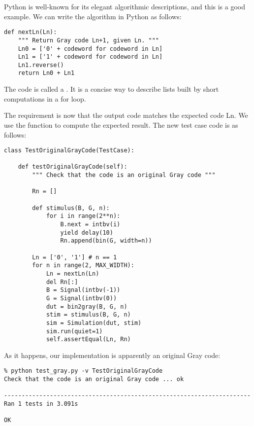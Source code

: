 Python is well-known  for its elegant algorithmic
descriptions, and this is a good example. We can write the algorithm
in Python as follows:

\begin{verbatim}
def nextLn(Ln):
    """ Return Gray code Ln+1, given Ln. """
    Ln0 = ['0' + codeword for codeword in Ln]
    Ln1 = ['1' + codeword for codeword in Ln]
    Ln1.reverse()
    return Ln0 + Ln1
\end{verbatim}

The code  is called a . It is a concise way to describe lists built by short
computations in a for loop.

The requirement is now that the output code matches the
expected code Ln. We use the  function to compute the
expected result. The new test case code is as follows:

\begin{verbatim}
class TestOriginalGrayCode(TestCase):

    def testOriginalGrayCode(self):
        """ Check that the code is an original Gray code """

        Rn = []
        
        def stimulus(B, G, n):
            for i in range(2**n):
                B.next = intbv(i)
                yield delay(10)
                Rn.append(bin(G, width=n))
        
        Ln = ['0', '1'] # n == 1
        for n in range(2, MAX_WIDTH):
            Ln = nextLn(Ln)
            del Rn[:]
            B = Signal(intbv(-1))
            G = Signal(intbv(0))
            dut = bin2gray(B, G, n)
            stim = stimulus(B, G, n)
            sim = Simulation(dut, stim)
            sim.run(quiet=1)
            self.assertEqual(Ln, Rn)
\end{verbatim}

As it happens, our implementation is apparently an original Gray code:

\begin{verbatim}
% python test_gray.py -v TestOriginalGrayCode
Check that the code is an original Gray code ... ok

----------------------------------------------------------------------
Ran 1 tests in 3.091s

OK
\end{verbatim}


 

